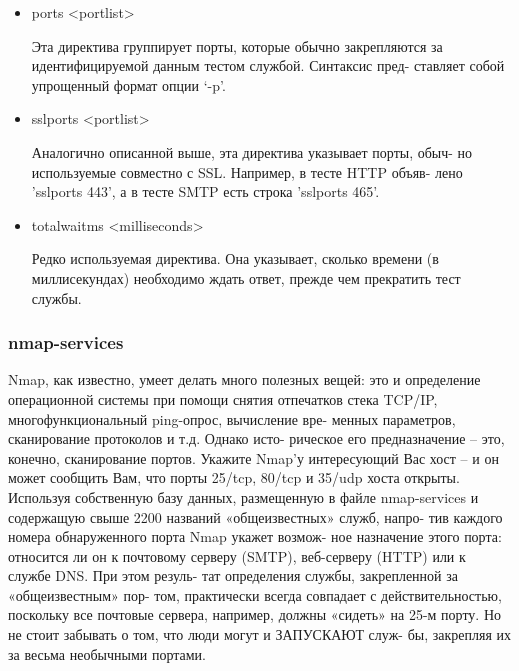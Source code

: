\documentclass[12pt,a4paper]{article}
\begin{document}
\begin{itemize}
\item ports <portlist>

Эта директива группирует порты, которые обычно закрепляются
за идентифицируемой данным тестом службой. Синтаксис пред-
ставляет собой упрощенный формат опции ‘-p’.

\item sslports <portlist>

Аналогично описанной выше, эта директива указывает порты, обыч-
но используемые совместно с SSL. Например, в тесте HTTP объяв-
лено ’sslports 443’, а в тесте SMTP есть строка ’sslports 465’.

\item totalwaitms <milliseconds>

Редко используемая директива. Она указывает, сколько времени (в
миллисекундах) необходимо ждать ответ, прежде чем прекратить
тест службы.
\end{itemize}

\subsubsection{nmap-services}

Nmap, как известно, умеет делать много полезных вещей: это и
определение операционной системы при помощи снятия отпечатков
стека TCP/IP, многофункциональный ping-опрос, вычисление вре-
менных параметров, сканирование протоколов и т.д. Однако исто-
рическое его предназначение – это, конечно, сканирование портов.
Укажите Nmap’у интересующий Вас хост – и он может сообщить
Вам, что порты 25/tcp, 80/tcp и 35/udp хоста открыты. Используя
собственную базу данных, размещенную в файле nmap-services и
содержащую свыше 2200 названий «общеизвестных» служб, напро-
тив каждого номера обнаруженного порта Nmap укажет возмож-
ное назначение этого порта: относится ли он к почтовому серверу
(SMTP), веб-серверу (HTTP) или к службе DNS. При этом резуль-
тат определения службы, закрепленной за «общеизвестным» пор-
том, практически всегда совпадает с действительностью, поскольку
все почтовые сервера, например, должны «сидеть» на 25-м порту.
Но не стоит забывать о том, что люди могут и ЗАПУСКАЮТ служ-
бы, закрепляя их за весьма необычными портами.
\end{document}
